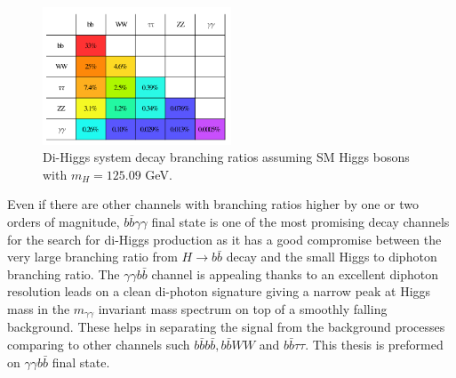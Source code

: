 \begin{figure}[H]
    \centering
    \includegraphics[width=0.5\textwidth]{Ch1/Img/HH_decays.png}
    \caption{Di-Higgs system decay branching ratios assuming SM Higgs bosons with $m_H=125.09$ GeV.}
    \label{fig:chap1:HH:HPD:DCY}
\end{figure}
Even if there are other channels with branching ratios higher by one or two orders of magnitude, $b\bar{b}\gamma\gamma$ final state is one of the most promising decay channels for the search for di-Higgs production as it has a good compromise between the very large branching ratio from $H\rightarrow b\bar{b}$ decay and the small Higgs to diphoton branching ratio. The $\gamma\gamma b\bar{b}$ channel is appealing thanks to an excellent diphoton resolution leads on a clean di-photon signature giving a narrow peak at Higgs mass in the $m_{\gamma\gamma}$ invariant mass spectrum
on top of a smoothly falling background. These helps in separating the signal from the background processes comparing to other channels such $b\bar{b}b\bar{b}, b\bar{b}WW$ and $b\bar{b}\tau\tau$. This thesis is preformed on $\gamma\gamma b\bar{b}$ final state.
